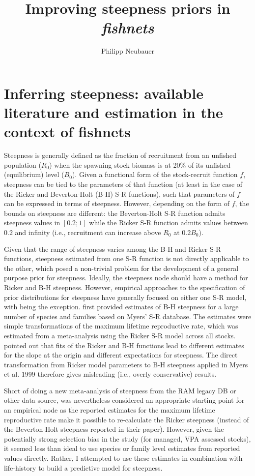 \documentclass{dragonfly-report}\usepackage[]{graphicx}\usepackage[]{color}
\title{Improving steepness priors in \emph{fishnets}}{Improving
  priors for the steepness of the stock-recruitment function within the R package \emph{fishnets}}
\subtitle{}
\author{Philipp Neubauer}
\begin{document}
\maketitle

\section{Inferring steepness: available literature and estimation in the context of fishnets}

Steepness is generally defined as the fraction of recruitment from an unfished population ($R_0$) when the spawning stock biomass is at 20\% of its unfished (equilibrium) level ($B_0$). Given a functional form of the stock-recruit function $f$, steepness can be tied to the parameters of that function (at least in the case of the Ricker and Beverton-Holt (B-H) S-R functions), such that parameters of $f$ can be expressed in terms of steepness. However, depending on the form of $f$, the bounds on steepness are different: the Beverton-Holt S-R function admits steepness values in $[0.2;1]$ while the Ricker S-R function admits values between $0.2$ and infinity (i.e., recruitment can increase above $R_0$ at $0.2 B_0$). 

Given that the range of steepness varies among the B-H and Ricker S-R functions, steepness estimated from one S-R function is not directly applicable to the other, which posed a non-trivial problem for the development of a general purpose prior for steepness. Ideally, the steepness node should have a method for Ricker and B-H steepness. However, empirical approaches to the specification of prior distributions for steepness have generally focused on either one S-R model, with \citet{michielsens_2004_bayesian} being the exception. \citet{myers_1999_maximum} first provided estimates of B-H steepness for a large number of species and families based on Myers' S-R database. The estimates were simple transformations of the maximum lifetime reproductive rate, which was estimated from a meta-analysis using the Ricker S-R model across all stocks. \citet{michielsens_2004_bayesian} pointed out that fits of the Ricker and B-H functions lead to different estimates for the slope at the origin and different expectations for steepness. The direct transformation from Ricker model parameters to B-H steepness applied in Myers et al. 1999 therefore gives misleading (i.e., overly conservative) results.

Short of doing a new meta-analysis of steepness from the RAM legacy DB or other data source, \citet{myers_1999_maximum} was nevertheless considered an appropriate starting point for an empirical node as the reported estimates for the maximum lifetime reproductive rate make it possible to re-calculate the Ricker steepness (instead of the Beverton-Holt steepness reported in their paper). However, given the potentially strong selection bias in the study (for managed, VPA assessed stocks), it seemed less than ideal to use species or family level estimates from reported values directly. Rather, I attempted to use these estimates in combination with life-history to build a predictive model for steepness.
\end{document}
